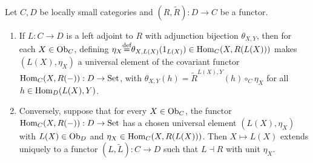 \documentclass[10pt,a4paper]{article}
\begin{document}
\begin{theorem}\label{thm:adj_yoneda}
Let $C, D$ be locally small categories and $(R, \widetilde{R}) : D \to C$ be a functor.
\begin{enumerate}
\item If $L : C \to D$ is a left adjoint to $R$ with adjunction bijection $\theta_{X,Y}$, then for each $X \in {\textrm{Ob}}_C$, defining $\eta_X {\stackrel{{\textrm{def}}}{=}} \theta_{X,L(X)}(1_{L(X)}) \in {\textrm{Hom}}_C(X, R(L(X)))$ makes $(L(X), \eta_X)$ a universal element of the covariant functor ${\textrm{Hom}}_C(X, R(-)) : D \to {\textrm{Set}}$, with $\theta_{X,Y}(h) = \widetilde{R}^{L(X),Y}(h) \circ_C \eta_X$ for all $h \in {\textrm{Hom}}_D(L(X), Y)$.
\item Conversely, suppose that for every $X \in {\textrm{Ob}}_C$, the functor ${\textrm{Hom}}_C(X, R(-)) : D \to {\textrm{Set}}$ has a chosen universal element $(L(X), \eta_X)$ with $L(X) \in {\textrm{Ob}}_D$ and $\eta_X \in {\textrm{Hom}}_C(X, R(L(X)))$. Then $X \mapsto L(X)$ extends uniquely to a functor $(L, \widetilde{L}) : C \to D$ such that $L \dashv R$ with unit $\eta_X$.
\end{enumerate}
\end{theorem}
\myprf
\end{document}

